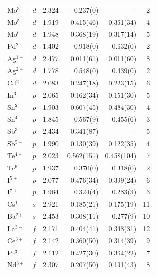 \begin{longtable}{l l r r r r}
  Mo$^{3+}$            & $d$   & 2.324 &    $-$0.237(0) &            --- & 2 \\
  Mo$^{5+}$            & $d$   & 1.919 &      0.415(46) &      0.351(34) & 4 \\
  Mo$^{6+}$            & $d$   & 1.948 &      0.368(19) &      0.317(14) & 5 \\
  Pd$^{2+}$            & $d$   & 1.402 &       0.918(0) &       0.632(0) & 2 \\
  Ag$^{1+}$            & $d$   & 2.477 &      0.011(61) &      0.011(60) & 8 \\
  Ag$^{2+}$            & $d$   & 1.778 &       0.548(0) &       0.439(0) & 2 \\
  Cd$^{2+}$            & $d$   & 2.083 &      0.247(18) &      0.223(15) & 6 \\
  In$^{3+}$            & $p$   & 2.065 &      0.162(34) &      0.151(30) & 5 \\
  Sn$^{2+}$            & $p$   & 1.903 &      0.607(45) &      0.484(30) & 4 \\
  Sn$^{4+}$            & $p$   & 1.845 &       0.567(9) &       0.455(6) & 3 \\
  Sb$^{3+}$            & $p$   & 2.434 &   $-$0.341(87) &            --- & 5 \\
  Sb$^{5+}$            & $p$   & 1.990 &      0.130(39) &      0.122(35) & 4 \\
  Te$^{4+}$            & $p$   & 2.023 &     0.562(151) &     0.458(104) & 7 \\
  Te$^{6+}$            & $p$   & 1.937 &       0.370(0) &       0.318(0) & 2 \\
  I$^{5+}$             & $p$   & 2.077 &      0.476(34) &      0.399(24) & 6 \\
  I$^{7+}$             & $p$   & 1.964 &       0.324(4) &       0.283(3) & 3 \\
  Cs$^{1+}$            & $s$   & 2.921 &      0.185(21) &      0.175(19) & 11 \\
  Ba$^{2+}$            & $s$   & 2.453 &      0.308(11) &       0.277(9) & 10 \\
  La$^{3+}$            & $f$   & 2.171 &      0.404(41) &      0.348(31) & 12 \\
  Ce$^{3+}$            & $f$   & 2.142 &      0.360(50) &      0.314(39) & 9 \\
  Pr$^{3+}$            & $f$   & 2.112 &      0.427(30) &      0.364(22) & 7 \\
  Nd$^{3+}$            & $f$   & 2.307 &      0.207(50) &      0.191(43) & 8 \\

\end{longtable}

